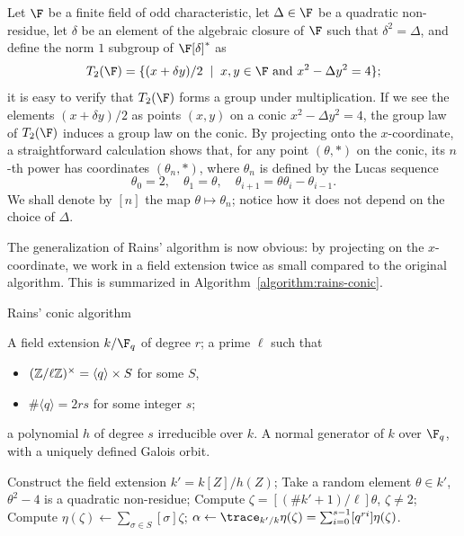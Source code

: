 Let $\F$ be a finite field of odd characteristic, let $\Delta\in\F$ be
a quadratic non-residue, let $\delta$ be an element of the algebraic
closure of $\F$ such that $\delta^2=\Delta$, and define the norm $1$
subgroup of $\F[\delta]^*$ as
\[T_2(\F) = \{(x+\delta y)/2 \;\mid\; x,y\in\F \text{ and } x^2-\Delta
  y^2 = 4\};\] %
it is easy to verify that $T_2(\F)$ forms a group under
multiplication. %
If we see the elements $(x+\delta y)/2$ as points $(x,y)$ on a conic
$x^2-\Delta y^2=4$, the group law of $T_2(\F)$ induces a group law on
the conic. %
By projecting onto the $x$-coordinate, a straightforward calculation
shows that, for any point $(\theta,*)$ on the conic, its $n$-th power
has coordinates $(\theta_n,*)$, where $\theta_n$ is defined by the
Lucas sequence
\[\theta_0 = 2, \quad \theta_1 = \theta, \quad \theta_{i+1}=\theta\theta_i-\theta_{i-1}.\] %
We shall denote by $[n]$ the map $\theta\mapsto\theta_n$; notice how
it does not depend on the choice of $\Delta$.

The generalization of Rains' algorithm is now obvious: by projecting
on the $x$-coordinate, we work in a field extension twice as small
compared to the original algorithm. %
This is summarized in Algorithm~\ref{algorithm:rains-conic}.

\begin{algorithm}
    \caption{Rains' conic algorithm}
  \label{algorithm:rains-conic}
  \begin{algorithmic}[1]
    \REQUIRE A field extension $k/\F_q$ of degree $r$; a prime $\ell$
    such that
    \begin{itemize}
    \item $(\mathbb{Z}/\ell\mathbb{Z})^\times = \langle q\rangle \times S$ for some $S$,
    \item $\#\langle q\rangle = 2rs$ for some integer $s$;
    \end{itemize}
    a polynomial $h$ of degree $s$ irreducible over $k$.
    \ENSURE A normal generator of $k$ over $\F_q$,
    with a uniquely defined Galois orbit.
    
    \STATE Construct the field extension $k'=k[Z]/h(Z)$;
    \REPEAT
    \REPEAT
    \STATE Take a random element $\theta\in k'$,
    \UNTIL\label{algorithm:rains-conic:sqtest} $\theta^2-4$ is a quadratic non-residue;
    \STATE\label{algorithm:rains-conic:power} Compute $\zeta=[(\#k'+1)/\ell]\theta$,
    \UNTIL $\zeta\ne2$;
    \STATE\label{algorithm:rains-conic:period} Compute $\eta(\zeta) \leftarrow \sum_{\sigma\in S}[\sigma]\zeta$;
    \RETURN\label{algorithm:rains-conic:trace} $\alpha \leftarrow \trace_{k'/k}\eta(\zeta) = \sum_{i=0}^{s-1}[q^{ri}]\eta(\zeta)$.
  \end{algorithmic}
\end{algorithm}

